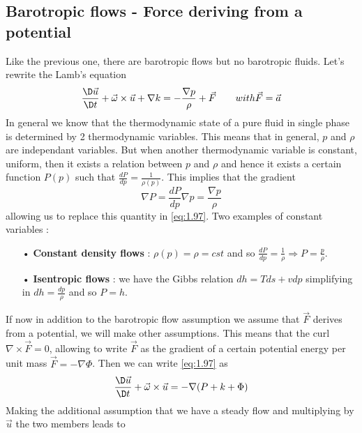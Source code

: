 	\subsection{Barotropic flows - Force deriving from a potential}
		Like the previous one, there are barotropic flows but no barotropic fluids. Let's rewrite the Lamb's equation 
		\begin{equation}
			\frac{\D \vec{u}}{\D t} + \vec{\omega} \times \vec{u} +\nabla k = - \frac{\nabla p}{\rho} + \vec{F} \qquad with \vec{F} = \vec{a}
			\label{eq:1.97}
		\end{equation}
		In general we know that the thermodynamic state of a pure fluid in single phase is determined by 2 thermodynamic variables. This means that in general, $p$ and $\rho$ are independant variables. But when another thermodynamic variable is constant, uniform, then it exists a relation between $p$ and $\rho$ and hence it exists a certain function $P(p)$ such that $\frac{dP}{dp} = \frac{1}{\rho (p)}$. This implies that the gradient
		\begin{equation}
			\nabla P = \frac{dP}{dp} \nabla p = \frac{\nabla p}{\rho}
		\end{equation}
		allowing us to replace this quantity in \eqref{eq:1.97}. Two examples of constant variables : \\
		\begin{itemize}
			\item[•] \textbf{Constant density flows} : $\rho(p) = \rho = cst$ and so $\frac{dP}{dp}=\frac{1}{\rho}\Rightarrow P = \frac{p}{\rho}$.
			\item[•] \textbf{Isentropic flows} : we have the Gibbs relation $dh = Tds + vdp$ simplifying in $dh = \frac{dp}{\rho}$ and so $P = h$. \\
		\end{itemize}
		
		If now in addition to the barotropic flow assumption we assume that $\vec{F}$ derives from a potential, we will make  other assumptions. This means that the curl $\nabla \times \vec{F} =0$, allowing to write $\vec{F}$ as the gradient of a certain potential energy per unit mass $\vec{F} = - \nabla \Phi$. Then we can write \eqref{eq:1.97} as
		\begin{equation}
			\frac{\D \vec{u}}{\D t} + \vec{\omega} \times \vec{u} = -\nabla (P+k +\Phi)
		\end{equation}
		Making the additional assumption that we have a steady flow and multiplying by $\vec{u}$ the two members leads to 
		\begin{center}
		\end{center}
		
